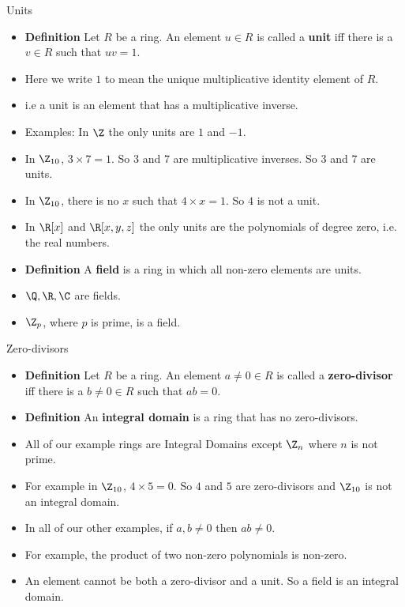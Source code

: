 \documentclass[handout]{beamer}
\begin{document}
\begin{frame}{Units}

\begin{itemize}
  \item \textbf{Definition} Let $R$ be a ring. An element $u\in R$ is called a \textbf{unit} iff there is a $v\in R$ such that $uv=1$.
  \item Here we write $1$ to mean the unique multiplicative identity element of $R$.
  \item i.e a unit is an element that has a multiplicative inverse.
  \item Examples: In $\Z$ the only units are $1$ and $-1$.
  \item In $\Z_{10}$, $3\times 7 = 1$. So $3$ and $7$ are multiplicative inverses. So $3$ and $7$ are units.
  \item In $\Z_{10}$, there is no $x$ such that $4\times x = 1$. So $4$ is not a unit.
  \item In $\R[x]$ and $\R[x,y,z]$ the only units are the polynomials of degree zero, i.e. the real numbers.
  \item \textbf{Definition} A \textbf{field} is a ring in which all non-zero elements are units.
  \item $\Q, \R, \C$ are fields.
  \item $\Z_p$, where $p$ is prime, is a field.
\end{itemize}

\end{frame}


\begin{frame}{Zero-divisors}

\begin{itemize}
  \item \textbf{Definition} Let $R$ be a ring. An element $a\not=0\in R$ is called a \textbf{zero-divisor} iff there is a $b\not=0\in R$ such that $ab=0$.
  \item \textbf{Definition} An \textbf{integral domain} is a ring that has no zero-divisors.
  \item All of our example rings are Integral Domains except $\Z_n$ where $n$ is not prime.
  \item For example in $\Z_{10}$, $4\times 5 = 0$. So $4$ and $5$ are zero-divisors and $\Z_{10}$ is not an integral domain.
  \item In all of our other examples, if $a,b\not=0$ then $ab \not = 0$.
  \item For example, the product of two non-zero polynomials is non-zero.
  \item An element cannot be both a zero-divisor and a unit. So a field is an integral domain.
\end{itemize}

\end{frame}
\end{document}
